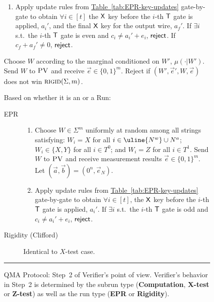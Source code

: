 \documentclass[11pt]{article}
\numberwithin{equation}{section}
\theoremstyle{definition}
\theoremstyle{plain}
\newcommand{\expref}[2]{\hyperref[#2]{#1~\ref{#2}}}
\newcommand{\rigid}{\textsc{rigid}}
\newcommand{\pv}{\textsc{PV}}
\newcommand{\highlight}[1]{\uline{#1}}
\begin{document}
\begin{figure}[H]
\begin{description}
\begin{description}
\begin{enumerate}
		\item[(ii)] Apply update rules from \expref{Table}{tab:EPR-key-updates} gate-by-gate to obtain $\forall i\in [t]$ the $\sf X$ key before the $i$-th $\sf T$ gate is applied, $a_i'$, and the final $\sf X$ key for the output wire, $a_f'$. 
If $\exists i$ s.t.\ the $i$-th $\sf T$ gate is even and $c_i\neq a_i'+e_i$, $\sf reject$. If $c_f+a_f'\neq 0$, $\sf reject$. 
	\end{enumerate}
	\item[Rigidity (Clifford)] Choose ${W}$ according to the marginal conditioned on ${W}'$, $\mu(\cdot|{W}')$. 
	Send ${W}$ to $\pv$ and receive $\vec{e}\in\{0,1\}^m$. Reject if   $({W}',\vec{e}',{W},\vec{e})$ does not win $\rigid(\Sigma,m)$. 
\end{description}

\item[$Z$-test] Based on whether it is 
an  or a  Run:
\begin{description}
	\item[EPR] 
	\begin{enumerate}
		\item[(i)] Choose $W\in\Sigma^m$ uniformly at random among all strings
      satisfying: $W_i=X$ for all $i\in \highlight{N^w} \cup N^a$; $W_i\in\{X,Y\}$ for all $i\in T^0$; and $W_i=Z$ for all $i\in T^1$. Send $W$ to $\pv$ and receive measurement results $\vec{e}\in\{0,1\}^m$. Let $(\vec{a},\vec{b})=(0^n,\vec{e}_N)$.
		\item[(ii)] Apply update rules from \expref{Table}{tab:EPR-key-updates} gate-by-gate to obtain $\forall i\in [t]$, the $\sf X$ key before the $i$-th $\sf T$ gate is applied, $a_i'$. 
If $\exists i$ s.t.\ the $i$-th $\sf T$ gate is odd and $c_i\neq a_i'+e_i$, $\sf reject$. 
	\end{enumerate}
	\item[Rigidity (Clifford)] Identical to $X$-test case.
\end{description}
\end{description}
\rule[2ex]{\textwidth}{0.5pt}\vspace{-.5cm}
\caption{QMA Protocol: Step~2 of Verifier's point of view. Verifier's behavior in Step~2 is determined by the subrun type (\textbf{Computation}, \textbf{X-test} or \textbf{Z-test}) as well as the run type (\textbf{EPR} or \textbf{Rigidity}).}\label{fig:qma-protocol-V-continued}
\end{figure}
\end{document}
